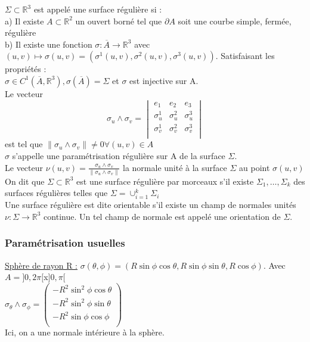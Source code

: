 \documentclass[../main.tex]{subfiles}
\begin{document}
$\Sigma \subset \mathbb{R}^3$ est appelé une surface régulière si :\\
a) Il existe $A\subset \mathbb{R}^2$ un ouvert borné tel que $\partial A$ soit une courbe simple, fermée, régulière\\
b) Il existe une fonction $\sigma : \overline{A} \rightarrow \mathbb{R}^3$ avec $(u,v) \mapsto \sigma(u,v) = (\sigma^1(u,v), \sigma^2(u,v), \sigma^3(u,v))$. Satisfaisant les propriétés :\\
$\sigma\in C^1(\overline{A}, \mathbb{R}^3), \sigma(\overline{A}) = \Sigma$ et $\sigma$ est injective sur A.\\
Le vecteur \\
\begin{equation}
    \sigma_u \wedge \sigma_v = \begin{vmatrix}
        e_1 & e_2 & e_3\\
        \sigma_u^1 & \sigma_u^2 & \sigma_u^3\\
        \sigma_v^1 & \sigma_v^2 & \sigma_v^3\\
    \end{vmatrix}
\end{equation}
 est tel que $\parallel \sigma_u \wedge \sigma_v \parallel \neq 0 \forall (u,v) \in A$\\
 $\sigma$ s'appelle une paramétrisation régulière sur A de la surface $\Sigma$.\\
 Le vecteur $\nu(u,v) = \frac{\sigma_u \wedge \sigma_v}{\parallel \sigma_u \wedge \sigma_v \parallel}$ la normale unité à la surface $\Sigma $ au point $\sigma(u,v)$\\

 On dit que $\Sigma \subset \mathbb{R}^3$ est une surface régulière par morceaux s'il existe $\Sigma_1, \dots, \Sigma_k$ des surfaces régulières telles que $\Sigma = \cup_{i=1}^k \Sigma_i$\\

 Une surface régulière est dite orientable s'il existe un champ de normales unités $\nu : \Sigma \rightarrow \mathbb{R}^3$ continue. Un tel champ de normale est appelé une orientation de $\Sigma$.\\

 \subsubsection{Paramétrisation usuelles}
\quad \underline{Sphère de rayon R :} $\sigma(\theta, \phi) = (R\sin{\phi}\cos{\theta}, R\sin{\phi}\sin{\theta}, R\cos{\phi})$. Avec $A=]0, 2\pi[$x$]0,\pi[$\\
$\sigma_{\theta}\wedge \sigma_{\phi} = \begin{pmatrix}
    -R^2 \sin^2\phi \cos{\theta}\\
    -R^2 \sin^2\phi \sin{\theta}\\
    -R^2 \sin{\phi} \cos{\phi}\\
\end{pmatrix}$\\
Ici, on a une normale intérieure à la sphère.\\
\end{document}
